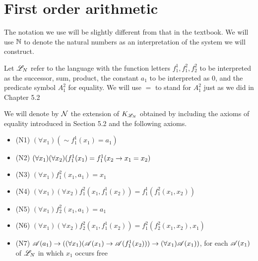 \section{First order arithmetic}

The notation we use will be slightly different from that in the textbook. We will use \(\mathbb{N}\) to denote the natural numbers as an interpretation of the system we will construct.

Let \(\mathscr{L}_{N}\) refer to the language with the function letters \(f^1_1, f^2_1, f^2_2\) to be interpreted as the successor, sum, product, the constant \(a_1\) to be interpreted as 0, and the predicate symbol \(A^2_1\) for equality. We will use \(=\) to stand for \(A^2_1\) just as we did in Chapter 5.2

We will denote by \(\mathcal{N}\) the extension of \(K_{\mathscr{L}_N}\) obtained by including the axioms of equality introduced in Section 5.2 and the following axioms.
\begin{itemize}
  \item (N1) \((\forall x_1)(\sim f^1_1(x_1) = a_1)\)
  \item (N2) \((\forall x_1)(\forall x_2)(f^1_1(x_1) = f^1_1(x_2 \rightarrow x_1 = x_2)\)
  \item (N3) \((\forall x_1)f^2_1(x_1, a_1) = x_1\)
  \item (N4) \((\forall x_1)(\forall x_2)f^2_1(x_1, f^1_1(x_2)) = f^1_1(f^2_1(x_1, x_2))\)
  \item (N5) \((\forall x_1)f^2_2(x_1, a_1) = a_1\)
  \item (N6) \((\forall x_1)(\forall x_2)f^2_2(x_1, f^1_1(x_2)) = f^2_1(f^2_2(x_1, x_2), x_1)\)
  \item (N7) \(\mathscr{A}(a_1) \rightarrow ((\forall x_1)(\mathscr{A}(x_1) \rightarrow \mathscr{A}(f^1_1(x_2))) \rightarrow (\forall x_1)\mathscr{A}(x_1))\), for each \wf{} \(\mathscr{A}(x_1)\) of \(\mathscr{L}_N\) in which \(x_1\) occurs free
\end{itemize}
